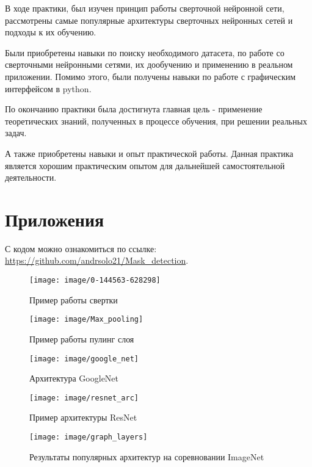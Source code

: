 \documentclass[a4paper,14pt]{article}
\begin{document}
	В ходе практики, был изучен принцип работы сверточной нейронной сети,  рассмотрены самые популярные архитектуры сверточных нейронных сетей и подходы к их обучению.
	
	Были приобретены навыки по поиску необходимого датасета, по работе со сверточными нейронными сетями, их дообучению и применению в реальном приложении.
	Помимо этого, были получены навыки по работе с графическим интерфейсом в python.
	
	По окончанию практики была достигнута главная цель - применение теоретических знаний, полученных в процессе обучения, при решении реальных задач.
	
	А также приобретены навыки и опыт практической работы.
	Данная практика является хорошим практическим опытом для дальнейшей самостоятельной деятельности.
	
	\pagebreak
	\section{Приложения}
	
	С кодом можно ознакомиться по ссылке: \href{https://github.com/andrsolo21/Mask_detection}{https://github.com/andrsolo21/Mask\_detection}.
	
	\begin{figure}[H]
		\centering
		\texttt{[image: image/0-144563-628298]}
		\caption{Пример работы свертки}
		\label{fig:0-144563-628298}
	\end{figure}
	
	\begin{figure}[H]
		\centering
		\texttt{[image: image/Max\_pooling]}
		\caption{Пример работы пулинг слоя}
		\label{fig:maxpooling}
	\end{figure}
	
	\begin{figure}[H]
		\centering
		\texttt{[image: image/google\_net]}
		\caption{Архитектура GoogleNet}
		\label{fig:googlenet}
	\end{figure}
	
	
	\begin{figure}[H]
		\centering
		\texttt{[image: image/resnet\_arc]}
		\caption{Пример архитектуры ResNet}
		\label{fig:resnetarc}
	\end{figure}
	
	
	\begin{figure}[H]
		\centering
		\texttt{[image: image/graph\_layers]}
		\caption{Результаты популярных архитектур на соревновании ImageNet}
		\label{fig:graphlayers}
	\end{figure}
	
\end{document}
